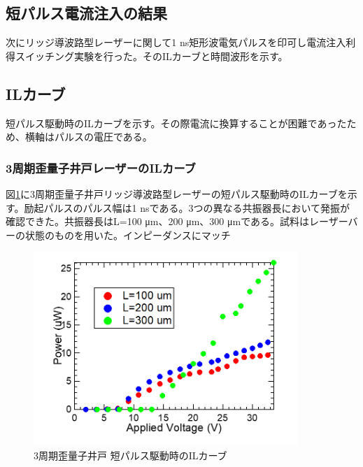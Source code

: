 {{\clearpage
\subsection{短パルス電流注入の結果}

次にリッジ導波路型レーザーに関して1 ns矩形波電気パルスを印可し電流注入利得スイッチング実験を行った。そのILカーブと時間波形を示す。
\subsection{ILカーブ}
短パルス駆動時のILカーブを示す。その際電流に換算することが困難であったため、横軸はパルスの電圧である。
\subsubsection{3周期歪量子井戸レーザーのILカーブ}
図\ref{fig:fig_3_2_3QW_ridge_GS_power}に3周期歪量子井戸リッジ導波路型レーザーの短パルス駆動時のILカーブを示す。励起パルスのパルス幅は1 nsである。3つの異なる共振器長において発振が確認できた。共振器長はL=100 \si{\micro\metre}、200 \si{\micro\metre}、300 \si{\micro\metre}である。試料はレーザーバーの状態のものを用いた。インピーダンスにマッチ

\begin{figure}[h]
	\centering
	\includegraphics[width=10cm]{figure/fig_3_2_3QW_ridge_GS_power.png}
		\caption{3周期歪量子井戸 短パルス駆動時のILカーブ}
		\label{fig:fig_3_2_3QW_ridge_GS_power}
\end{figure}


}}
